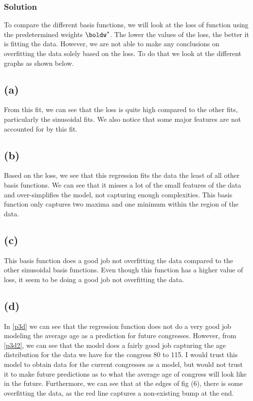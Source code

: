\documentclass[submit]{harvardml}
\begin{document}
\subsubsection*{Solution}
To compare the different basis functions, we will look at the loss of function using the predetermined weights $\boldw^*$. The lower the values of the loss, the better it is fitting the data. However, we are not able to make any conclusions on overfitting the data solely based on the loss. To do that we look at the different graphs as shown below.
\subsection*{(a)}
From this fit, we can see that the loss is quite high compared to the other fits, particularly the sinusoidal fits. We also notice that some major features are not accounted for by this fit.
\subsection*{(b)}
Based on the loss, we see that this regression fits the data the least of all other basis functions. We can see that it misses a lot of the small features of the data and over-simplifies the model, not capturing enough complexities. This basis function only captures two maxima and one minimum within the region of the data.

\subsection*{(c)}
This basis function does a good job not overfitting the data compared to the other sinusoidal basis functions. Even though this function has a higher value of loss, it seem to be doing a good job not overfitting the data. 
\subsection*{(d)}
In \cref{p3d} we can see that the regression function does not do a very good job modeling the average age as a prediction for future congresses. However, from \cref{p3d2}, we can see that the model does a fairly good job capturing the age distribution for the data we have for the congress 80 to 115. I would trust this model to obtain data for the current congresses as a model, but would not trust it to make future predictions as to what the average age of congress will look like in the future. Furthermore, we can see that at the edges of fig (6), there is some overfitting the data, as the red line captures a non-existing bump at the end.
\end{document}

